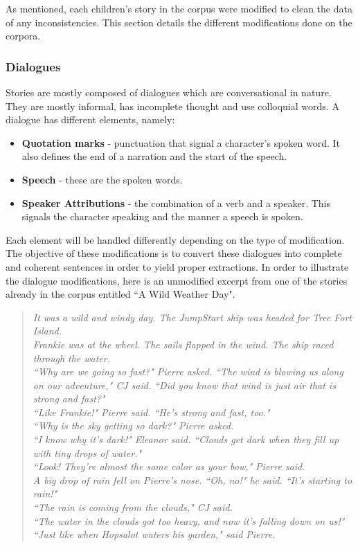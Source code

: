 As mentioned, each children's story in the corpus were modified to clean the data of any inconsistencies. This section details the different modifications done on the corpora.

\subsubsection*{Dialogues}

Stories are mostly composed of dialogues which are conversational in nature. They are mostly informal, has incomplete thought and use colloquial words. A dialogue has different elements, namely:

\begin{itemize}
\item \textbf{Quotation marks} - punctuation that signal a character's spoken word. It also defines the end of a narration and the start of the speech.
\item \textbf{Speech} - these are the spoken words. 
\item \textbf{Speaker Attributions} - the combination of a verb and a speaker. This signals the character speaking and the manner a speech is spoken.
\end{itemize}

Each element will be handled differently depending on the type of modification. The objective of these modifications is to convert these dialogues into complete and coherent sentences in order to yield proper extractions. In order to illustrate the dialogue modifications, here is an unmodified excerpt from one of the stories already in the corpus entitled ``A Wild Weather Day".

\begin{verse}
\itshape
It was a wild and windy day. The JumpStart ship was headed for Tree Fort Island. \\
Frankie was at the wheel. The sails flapped in the wind. The ship raced through the water. \\
``Why are we going so fast?" Pierre asked. ``The wind is blowing us along on our adventure," CJ said. ``Did you know that wind is just air that is strong and fast?" \\
``Like Frankie!" Pierre said. ``He's strong and fast, too." \\
``Why is the sky getting so dark?" Pierre asked. \\
``I know why it's dark!" Eleanor said. ``Clouds get dark when they fill up with tiny drops of water." \\
``Look! They're almost the same color as your bow," Pierre said. \\
A big drop of rain fell on Pierre's nose. ``Oh, no!" he said. ``It's starting to rain!" \\
``The rain is coming from the clouds," CJ said. \\
``The water in the clouds got too heavy, and now it's falling down on us!" \\
``Just like when Hopsalot waters his garden," said Pierre. \\
\end{verse}

